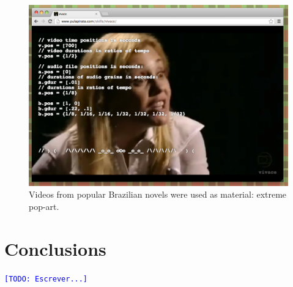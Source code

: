 \documentclass[letterpaper, 12pt]{article}
\newcommand{\inote}[1]{\textcolor{blue}{\texttt{\footnotesize[#1]}}}
\newcommand{\todo}[1]{\inote{TODO: #1}}
\begin{document}


\begin{figure}[htpb]
  \begin{center}
    \includegraphics[scale=.3]{img/fig_novela.png}
    \caption{Videos from popular Brazilian novels were used as
      material: extreme pop-art.}
    \label{fig:novela}
  \end{center}
\end{figure}




\section{Conclusions}




\todo{Escrever...}



\end{document}
